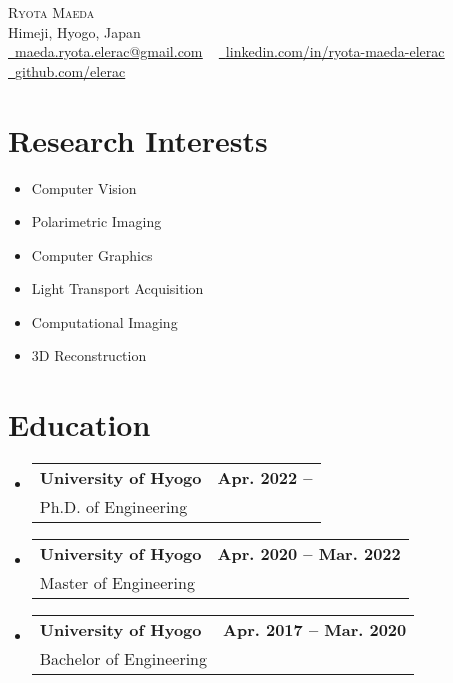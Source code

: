 \documentclass[letterpaper,11pt]{article}
\makeatletter
\newcommand{\resumeSubheading}[3]{
  \vspace{-2pt}\item
    \begin{tabular*}{1.0\textwidth}[t]{l@{\extracolsep{\fill}}r}
      \textbf{#1} & \textbf{\small #2} \\
      {\small#3} &  \\
    \end{tabular*}\vspace{-7pt}
}
\newcommand{\resumeSubHeadingListStart}{\begin{itemize}[leftmargin=0.0in, label={}]}
\newcommand{\resumeSubHeadingListEnd}{\end{itemize}}
\makeatother
\begin{document}

\begin{center}
    {\Huge \scshape Ryota Maeda} \\ \vspace{1pt}
    Himeji, Hyogo, Japan \\ \vspace{1pt}
    \small \href{mailto:maeda.ryota.elerac@gmail.com}{\raisebox{-0.2\height}\faEnvelope\  \underline{maeda.ryota.elerac@gmail.com}} ~ 
    \href{https://www.linkedin.com/in/ryota-maeda-elerac/}{\raisebox{-0.2\height}\faLinkedin\ \underline{linkedin.com/in/ryota-maeda-elerac}}  ~
    \href{https://github.com/elerac}{\raisebox{-0.2\height}\faGithub\ \underline{github.com/elerac}}
    \vspace{-8pt}
\end{center}

\section{Research Interests}
    \begin{multicols}{3}
        \begin{itemize}[itemsep=-5pt, parsep=3pt]
            \item\small Computer Vision
            \item Polarimetric Imaging
            \item Computer Graphics
            \item Light Transport Acquisition
            \item Computational Imaging
            \item 3D Reconstruction 
        \end{itemize}
    \end{multicols}
    \vspace*{2.0\multicolsep}

\section{Education}
  \resumeSubHeadingListStart
    \resumeSubheading
      {University of Hyogo}{Apr. 2022 -- \phantom{Mar. 2025}}
      {Ph.D. of Engineering}
    \resumeSubheading
      {University of Hyogo}{Apr. 2020 -- Mar. 2022}
      {Master of Engineering}
    \resumeSubheading
      {University of Hyogo}{Apr. 2017 -- Mar. 2020}
      {Bachelor of Engineering}
  \resumeSubHeadingListEnd
\end{document}
